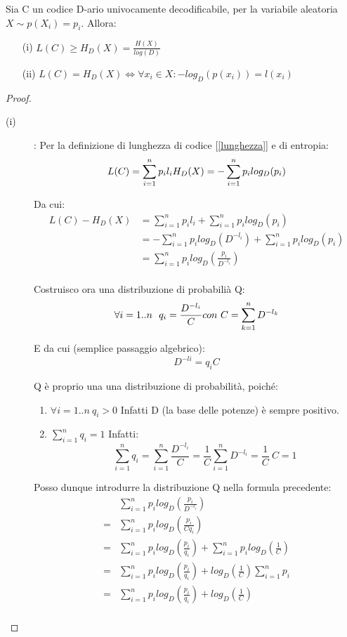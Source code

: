 \begin{teorema} Sia C un codice D-ario univocamente decodificabile, per la variabile aleatoria 
$X \sim p(X_i)=p_i$. Allora:
\begin{itemize}
\item[(i)]
$
 L(C) \ge H_D(X) = \frac{H(X)}{log(D)}
$
\item[(ii)]
$
 L(C) = H_D(X) \iff \forall x_i \in X: -log_D(p(x_i))=l(x_i)
$
\end{itemize}
\label{limitelcodice}
\begin{proof}
\mbox{}

\begin{description}
\item[(i)]: 
Per la definizione di lunghezza di codice [\ref{lunghezza}] e di entropia:
\[
 L(C)=\sum_{i=1}^n p_i l_i \\ H_D(X)=-\sum_{i=1}^n p_i log_D(p_i)
\]

\noindent
Da cui:
\[ \begin{split}
 L(C) - H_D(X) &=\sum_{i=1}^n p_i l_i + \sum_{i=1}^n p_i log_D(p_i) \\
               &=-\sum_{i=1}^n p_i log_D(D^{-l_i}) + \sum_{i=1}^n p_i log_D(p_i) \\
               &=\sum_{i=1}^n p_i log_D \left( \frac{p_i}{D^{-l_i}} \right)  \\
 \end{split}
\]

\noindent
Costruisco ora una distribuzione di probabilià Q:
\[
 \forall i=1..n \ \ q_i=\frac{D^{-l_i}}{C} \\ con \ C=\sum_{k=1}^n D^{-l_k}
\]

\noindent
E da cui (semplice passaggio algebrico):
\[
 D^{-li}=q_i C
\]

\noindent
Q è proprio una una distribuzione di probabilità, poiché:
\begin{enumerate}
 \item $\forall i=1..n \ q_i >0$ Infatti D (la base delle potenze) è sempre positivo.
 \item $\displaystyle\sum_{i=1}^n q_i=1$ Infatti:
  \[
   \sum_{i=1}^n q_i=\sum_{i=1}^n \frac{D^{-l_i}}{C}= \frac{1}{C} \sum_{i=1}^n D^{-l_i} =\frac{1}{C} \ C = 1
  \]

\end{enumerate}

Posso dunque introdurre la distribuzione Q nella formula precedente:
\[ \begin{split}
  & \sum_{i=1}^n p_i log_D \left( \frac{p_i}{D^{-l_i}} \right)  \\
  =&\sum_{i=1}^n p_i log_D \left( \frac{p_i}{C q_i} \right)  \\
  =&\sum_{i=1}^n p_i log_D \left( \frac{p_i}{q_i} \right) + \sum_{i=1}^n p_i log_D \left( \frac{1}{C} \right) \\      
  =&\sum_{i=1}^n p_i log_D \left( \frac{p_i}{q_i} \right) + log_D \left( \frac{1}{C} \right) \sum_{i=1}^n p_i \\
  =&\sum_{i=1}^n p_i log_D \left( \frac{p_i}{q_i} \right) + log_D \left( \frac{1}{C} \right)\\
 \end{split}
\]


\end{description}
\end{proof}
\end{teorema}
